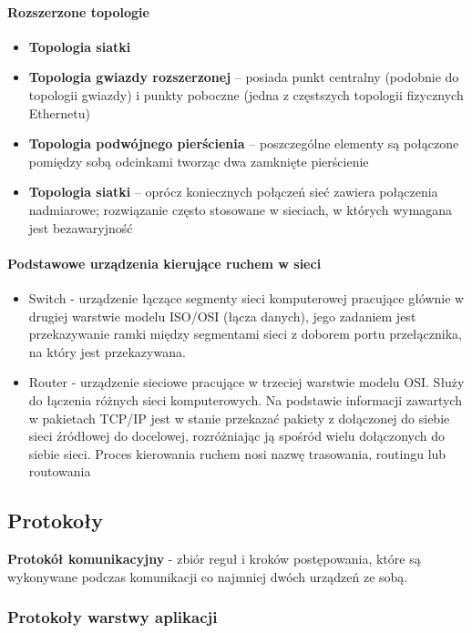 \documentclass[a4paper,twoside]{report}
\begin{document}
\paragraph{Rozszerzone topologie}
\begin{itemize}
\item \textbf{Topologia siatki}
\item \textbf{Topologia gwiazdy rozszerzonej} – posiada punkt centralny (podobnie do topologii gwiazdy) i punkty poboczne (jedna z częstszych topologii fizycznych Ethernetu)
\item \textbf{Topologia podwójnego pierścienia} – poszczególne elementy są połączone pomiędzy sobą odcinkami tworząc dwa zamknięte pierścienie
\item \textbf{Topologia siatki} – oprócz koniecznych połączeń sieć zawiera połączenia nadmiarowe; rozwiązanie często stosowane w sieciach, w których wymagana jest bezawaryjność
\end{itemize}

\paragraph{Podstawowe urządzenia kierujące ruchem w sieci}
\begin{itemize}
\item Switch -  urządzenie łączące segmenty sieci komputerowej pracujące głównie w drugiej warstwie modelu ISO/OSI (łącza danych), jego zadaniem jest przekazywanie ramki między segmentami sieci z doborem portu przełącznika, na który jest przekazywana.
\item Router - urządzenie sieciowe pracujące w trzeciej warstwie modelu OSI. Służy do łączenia różnych sieci komputerowych. Na podstawie informacji zawartych w pakietach TCP/IP jest w stanie przekazać pakiety z dołączonej do siebie sieci źródłowej do docelowej, rozróżniając ją spośród wielu dołączonych do siebie sieci. Proces kierowania ruchem nosi nazwę trasowania, routingu lub routowania
\end{itemize}




\subsection{Protokoły}

\textbf{Protokół komunikacyjny} - zbiór reguł i kroków postępowania, które są wykonywane podczas komunikacji co najmniej dwóch urządzeń ze sobą.
\medskip 


\subsubsection{Protokoły warstwy aplikacji}
\end{document}
